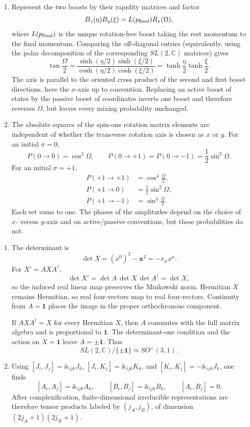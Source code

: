 \begin{enumerate}
\begin{enumerate}
\item
Represent the two boosts by their rapidity matrices and factor
\[
 B_z(\eta)B_y(\xi)=L(p_{\rm final})R_x(\Omega),
\]
where \(L(p_{\rm final})\) is the unique rotation-free boost taking the
rest momentum to the final momentum.  Comparing the off-diagonal entries
(equivalently, using the polar decomposition of the corresponding
\(SL(2,\mathbb C)\) matrices) gives
\[
 \tan\frac{\Omega}{2}
 =\frac{\sinh(\eta/2)\sinh(\xi/2)}
 {\cosh(\eta/2)\cosh(\xi/2)}
 =\tanh\frac{\eta}{2}\tanh\frac{\xi}{2}.
\]
The axis is parallel to the oriented cross product of the second and first
boost directions, here the \(x\)-axis up to convention.  Replacing an
active boost of states by the passive boost of coordinates inverts one
boost and therefore reverses \(\Omega\), but leaves every mixing
probability unchanged.
\item
The absolute squares of the spin-one rotation matrix elements are
independent of whether the transverse rotation axis is chosen as \(x\) or
\(y\).  For an initial \(\sigma=0\),
\[
 P(0\to0)=\cos^2\Omega,\qquad
 P(0\to+1)=P(0\to-1)=\frac12\sin^2\Omega.
\]
For an initial \(\sigma=+1\),
\[
\begin{aligned}
 P(+1\to+1)&=\cos^4\frac{\Omega}{2},\\
 P(+1\to0)&=\frac12\sin^2\Omega,\\
 P(+1\to-1)&=\sin^4\frac{\Omega}{2}.
\end{aligned}
\]
Each set sums to one.  The phases of the amplitudes depend on the choice of
\(x\)- versus \(y\)-axis and on active/passive conventions, but these
probabilities do not.
\end{enumerate}

\begin{enumerate}
\item
The determinant is
\[
 \det X=(x^0)^2-\mathbf x^2=-x_\mu x^\mu.
\]
For \(X'=AXA^\dagger\),
\[
 \det X'=\det A\,\det X\,\det A^\dagger=\det X,
\]
so the induced real linear map preserves the Minkowski norm.  Hermitian
\(X\) remains Hermitian, so real four-vectors map to real four-vectors.
Continuity from \(A=\mathbf{1}\) places the image in the proper
orthochronous component.

If \(AXA^\dagger=X\) for every Hermitian \(X\), then \(A\) commutes with
the full matrix algebra and is proportional to \(\mathbf{1}\).  The
determinant-one condition and the action on \(X=\mathbf{1}\) leave
\(A=\pm\mathbf{1}\).  Thus
\[
 SL(2,\mathbb C)/\{\pm\mathbf{1}\}\simeq SO^+(3,1).
\]
\item
Using
\([J_i,J_j]=\ii\epsilon_{ijk}J_k\),
\([J_i,K_j]=\ii\epsilon_{ijk}K_k\), and
\([K_i,K_j]=-\ii\epsilon_{ijk}J_k\), one finds
\[
 [A_i,A_j]=\ii\epsilon_{ijk}A_k,\qquad
 [B_i,B_j]=\ii\epsilon_{ijk}B_k,\qquad
 [A_i,B_j]=0.
\]
After complexification, finite-dimensional irreducible representations are
therefore tensor products labeled by
\((j_A,j_B)\), of dimension \((2j_A+1)(2j_B+1)\).


\end{enumerate}
\end{enumerate}
